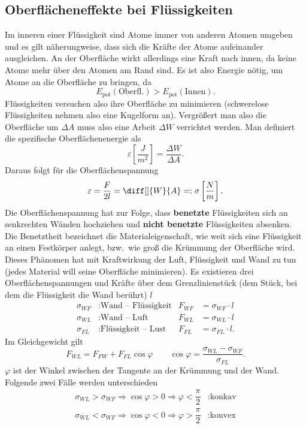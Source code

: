 \documentclass[a4paper,12pt]{article}
\numberwithin{equation}{section}
\begin{document}
\subsection{Oberflächeneffekte bei Flüssigkeiten}
Im inneren einer Flüssigkeit sind Atome immer von anderen Atomen umgeben und es gilt näherungweise, dass sich die Kräfte der Atome aufeinander ausgleichen. An der Oberfläche wirkt allerdings eine Kraft nach innen, da keine Atome mehr über den Atomen am Rand sind. Es ist also Energie nötig, um Atome an die Oberfläche zu bringen, da
\[ 
        E_{\text{pot}}\left(\text{Oberfl.}\right)>E_{\text{pot}}\left(\text{Innen}\right)
.\] 
Flüssigkeiten \glqq versuchen\grqq{} also ihre Oberfläche zu minimieren (schwerelose Flüssigkeiten nehmen also eine Kugelform an). Vergrößert man also die Oberfläche um $\Delta A$ muss also eine Arbeit $\Delta W$ verrichtet werden. Man definiert die spezifische Oberflächenenergie als
\[ 
        \varepsilon \left[\dfrac{J}{m^2}\right]=\dfrac{\Delta W}{\Delta A}
.\] 
Daraus folgt für die Oberflächenspannung
\[ 
        \varepsilon =\dfrac{F}{2l}=\diff[]{W}{A}=:\sigma \left[\dfrac{N}{m}\right]
.\] 
Die Oberflächenspannung hat zur Folge, dass \textbf{benetzte} Flüssigkeiten sich an senkrechten Wänden hochziehen und \textbf{nicht benetzte} Flüssigkeiten absenken. Die Benetztheit bezeichnet die Materialeigenschaft, wie weit sich eine Flüssigkeit an einen Festkörper anlegt, bzw.\ wie groß die Krümmung der Oberfläche wird. Dieses Phänomen hat mit Kraftwirkung der Luft, Flüssigkeit und Wand zu tun (jedes Material will seine Oberfläche minimieren). Es existieren drei Oberflächenspannungen und Kräfte über dem Grenzlinienstück (dem Stück, bei dem die Flüssigkeit die Wand berührt) $l$
\begin{align*}
        \sigma _{WF}&:\text{Wand -- Flüssigkeit}&F_{WF}&=\sigma _{WF}\cdot l\\
        \sigma _{WL}&:\text{Wand -- Luft}&F_{WL}&=\sigma _{WL}\cdot l\\
        \sigma _{FL}&:\text{Flüssigkeit -- Lust}&F_{FL}&=\sigma _{FL}\cdot l
.\end{align*}
Im Gleichgewicht gilt
\[ 
        F_{WL}=F_{FW}+F_{FL}\cos \varphi \qquad \cos \varphi =\dfrac{\sigma _{WL}-\sigma _{WF}}{\sigma _{FL}}
.\] 
$\varphi $ ist der Winkel zwischen der Tangente an der Krümmung und der Wand. Folgende zwei Fälle werden unterschieden
\begin{align*}
        \sigma _{WL}>\sigma _{WF}\Rightarrow \cos \varphi >0\Rightarrow \varphi <\dfrac{\pi }{2}&:\text{konkav}\\
        \sigma _{WL}<\sigma _{WF}\Rightarrow \cos \varphi <0\Rightarrow \varphi >\dfrac{\pi }{2}&:\text{konvex}
\end{align*}
\end{document}
